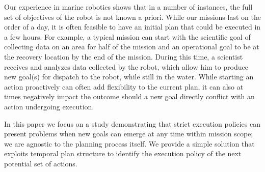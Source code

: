 Our experience in marine robotics shows that in a number of instances,
the full set of objectives of the robot is not known a priori. While
our missions last on the order of a day, it is often feasible to have
an initial plan that could be executed in a few hours. For example, a
typical mission can start with the scientific goal of collecting data on
an area for half of the mission and an operational goal to be at the
recovery location by the end of the mission. During this time, a
scientist receives and analyzes data collected by the robot, which
allow him to produce new goal(s) for dispatch to the robot, while
still in the water.  While starting an action proactively can often
add flexibility to the current plan, it can also at times negatively
impact the outcome should a new goal directly conflict with an action
undergoing execution.

In this paper we focus on a study demonstrating that strict execution
policies can present problems when new goals can emerge at any time
within mission scope; we are agnostic to the planning process
itself. We provide a simple solution that exploits temporal plan
structure to identify the execution policy of the next potential set
of actions. %






